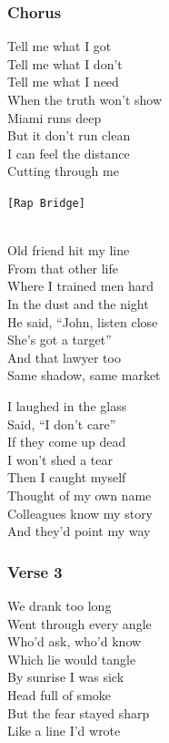 \documentclass[]{article}
\begin{document}
\subsubsection{Chorus}\label{chorus-26}

Tell me what I got\\
Tell me what I don't\\
Tell me what I need\\
When the truth won't show\\
Miami runs deep\\
But it don't run clean\\
I can feel the distance\\
Cutting through me

\texttt{{[}Rap\ Bridge{]}}\strut \\
Old friend hit my line\\
From that other life\\
Where I trained men hard\\
In the dust and the night\\
He said, ``John, listen close\\
She's got a target''\\
And that lawyer too\\
Same shadow, same market

I laughed in the glass\\
Said, ``I don't care''\\
If they come up dead\\
I won't shed a tear\\
Then I caught myself\\
Thought of my own name\\
Colleagues know my story\\
And they'd point my way

\subsubsection{Verse 3}\label{verse-3-6}

We drank too long\\
Went through every angle\\
Who'd ask, who'd know\\
Which lie would tangle\\
By sunrise I was sick\\
Head full of smoke\\
But the fear stayed sharp\\
Like a line I'd wrote
\end{document}

